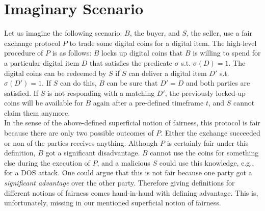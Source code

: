 \documentclass{cacthesis}
\begin{document}
        \section{Imaginary Scenario}
        Let us imagine the following scenario: $B$, the buyer, and $S$, the seller, use a fair exchange protocol $P$ to trade some digital coins for a digital item. The high-level procedure of $P$ is as follows: $B$ locks up digital coins that $B$ is willing to spend for a particular digital item $D$ that satisfies the predicate $\sigma$ s.t. $\sigma\left( D\right) =1$. The digital coins can be redeemed by $S$ if $S$ can deliver a digital item $D'$ s.t. $\sigma\left( D'\right) =1$. If $S$ can do this, $B$ can be sure that $D' = D$ and both parties are satisfied. If $S$ is not responding with a matching $D'$, the previously locked-up coins will be available for $B$ again after a pre-defined timeframe $t$, and $S$ cannot claim them anymore. \\
        In the sense of the above-defined superficial notion of fairness, this protocol is fair because there are only two possible outcomes of $P$. Either the exchange succeeded or non of the parties receives anything. 
        Although $P$ is certainly fair under this definition, $B$ got a significant disadvantage. $B$ cannot use the coins for something else during the execution of $P$, and a malicious $S$ could use this knowledge, e.g., for a DOS attack. One could argue that this is not fair because one party got a \textit{significant advantage} over the other party. Therefore giving definitions for different notions of fairness comes hand-in-hand with defining advantage. This is, unfortunately, missing in our mentioned superficial notion of fairness. 
        
\end{document}
